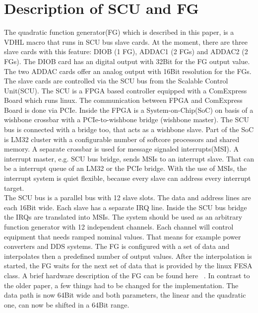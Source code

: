 \documentclass[a4paper,
              ]{jacow}
\begin{document}
\section{Description of SCU and FG}
The quadratic function generator(FG) which is described in this paper, is a VDHL macro that runs in SCU bus slave cards. At the moment, there are three slave cards with this feature: DIOB (1 FG), ADDAC1 (2 FGs) and ADDAC2 (2 FGs). The DIOB card has an digital output with 32Bit for the FG output value. The two ADDAC cards offer an analog output with 16Bit resolution for the FGs.
The slave cards are
controlled via the SCU bus from the Scalable Control Unit(SCU). The SCU is a FPGA based controller equipped with a ComExpress Board which runs linux. The communication between FPGA and ComExpress Board is done via PCIe. Inside the FPGA is a System-on-Chip(SoC) on basis of a wishbone\cite{ref_wishbone} crossbar with a PCIe-to-wishbone bridge (wishbone master). The SCU bus is connected with a bridge too, that acts as a wishbone slave. Part of the SoC is LM32 cluster with a configurable number of softcore processors and shared memory. A separate crossbar is used for message signaled interrupts(MSI). A interrupt master, e.g. SCU bus bridge, sends MSIs to an interrupt slave. That can be a interrupt queue of an LM32 or the PCIe bridge. With the use of MSIs, the interrupt system is quiet flexible, because every slave can address every interrupt target.\\
The SCU bus is a parallel bus with 12 slave slots. The data and address lines are each 16Bit wide. Each slave has a separate IRQ line. Inside the SCU bus bridge the IRQs are translated into MSIs.
The system should be used as an arbitrary function generator with 12 independent channels. Each channel will control equipment that needs ramped nominal values. That means for example  power converters and DDS systems.
The FG is configured with a set of data and interpolates then a predefined number of output values. After the interpolation is started, the FG waits for the next set of data that
is provided by the linux FESA class. A brief hardware description of the FG can be found here ~\cite{ref_fg_paper}. In contrast to the older paper, a few things had to be changed for the implementation.
The data path is now 64Bit wide and both parameters, the linear and the quadratic one, can now be shifted in a 64Bit range.
\end{document}

